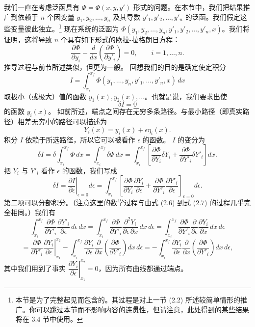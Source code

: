 我们一直在考虑泛函具有 $\Phi = \Phi(x, y, y')$ 形式的问题。在本节中，我们把结果推广到依赖于 $n$ 个因变量 $y_1, y_2, \ldots, y_n$ 及其导数 $y'_1, y'_2, \ldots, y'_n$ 的泛函。我们假定这些变量彼此独立。\footnote{本节是为了完整起见而包含的。其过程是对上一节 (2.2) 所述较简单情形的推广。你可以跳过本节而不影响内容的连贯性，但请注意，此处得到的某些结果将在 3.4 节中使用。}
现在系统的泛函为 $\Phi(y_1, y_2, \ldots, y_n, y'_1, y'_2, \ldots, y'_n, x)$。我们将证明，这将导致 $n$ 个具有如下形式的欧拉-拉格朗日方程：
$$
\frac{\partial\Phi}{\partial y_i} - \frac{d}{dx}\left(\frac{\partial\Phi}{\partial y'_i}\right) = 0,
\qquad i = 1, \ldots, n.
$$
推导过程与前节所述类似，但更为一般。
回想我们的目的是确定使定积分
$$
I = \int_{x_i}^{x_f} \Phi(y_1, \ldots, y_n, y'_1, \ldots, y'_n, x)\, dx
$$
取极小（或极大）值的函数 $y_1(x), y_2(x), \ldots$。也就是说，我们要求出使
$$
\delta I = 0
$$
的函数 $y_i(x)$。
如前所述，端点之间存在无穷多条路径。与最小路径（即真实路径）相差无穷小的路径可以描述为
$$
Y_i(x) = y_i(x) + \epsilon\eta_i(x).
$$
积分 $I$ 依赖于所选路径，所以它可以被看作 $\epsilon$ 的函数。
$I$ 的变分为
$$
\delta I = \delta\int_{x_i}^{x_f} \Phi\, dx
= \int_{x_i}^{x_f} \delta\Phi\, dx
= \int_{x_i}^{x_f}\left[\frac{\partial\Phi}{\partial Y_i}\delta Y_i
+ \frac{\partial\Phi}{\partial Y'_i}\delta Y'_i\right] dx.
$$
把 $Y_i$ 与 $Y'_i$ 看作 $\epsilon$ 的函数，我们写成
$$
\delta I = \left.\frac{\partial I}{\partial\epsilon}\right|_{\epsilon=0} d\epsilon
= \int_{x_i}^{x_f}\left[\frac{\partial\Phi}{\partial Y_i}\frac{\partial Y_i}{\partial\epsilon}
+ \frac{\partial\Phi}{\partial Y'_i}\frac{\partial Y'_i}{\partial\epsilon}\right]_{\epsilon=0} d\epsilon.
$$
第二项可以分部积分。（注意这里的数学过程与由式 (2.6) 到式 (2.7) 的过程几乎完全相同。）我们有
$$
\int_{x_i}^{x_f} \frac{\partial\Phi}{\partial Y'_i}\frac{\partial Y'_i}{\partial\epsilon}\, d\epsilon\, dx
= \int_{x_i}^{x_f} \frac{\partial\Phi}{\partial Y'_i}\frac{\partial^2 Y_i}{\partial\epsilon\,\partial x}\, dx\, d\epsilon
= \int_{x_i}^{x_f} \frac{\partial\Phi}{\partial Y'_i}\frac{\partial}{\partial\epsilon}\frac{\partial Y_i}{\partial x}\, dx\, d\epsilon
$$
$$
= \left.\frac{\partial\Phi}{\partial Y'_i}\frac{\partial Y_i}{\partial\epsilon}\right|_{x_1}^{x_2}
- \int_{x_i}^{x_f}\frac{\partial Y_i}{\partial\epsilon}\frac{\partial}{\partial x}\left(\frac{\partial\Phi}{\partial Y'_i}\right) dx\, d\epsilon
= - \int_{x_i}^{x_f}\frac{\partial Y_i}{\partial\epsilon}\frac{\partial}{\partial x}\left(\frac{\partial\Phi}{\partial Y'_i}\right) dx\, d\epsilon,
$$
其中我们用到了事实 $\left.\dfrac{\partial Y_i}{\partial\epsilon}\right|_{x_1}^{x_2} = 0$，因为所有曲线都通过端点。
